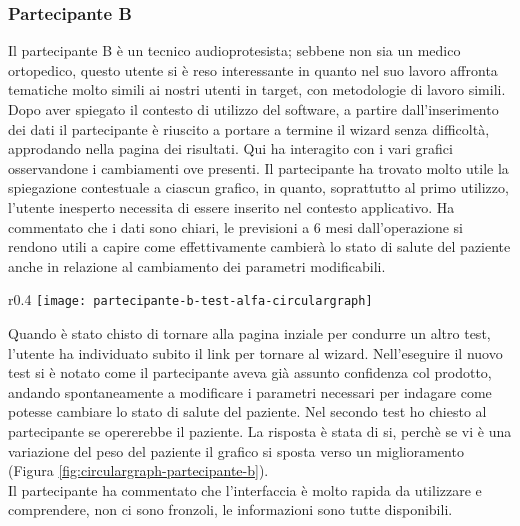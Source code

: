\subsubsection{Partecipante B}
Il partecipante B è un tecnico audioprotesista; sebbene non sia un medico ortopedico, questo utente si è reso interessante in quanto nel suo lavoro affronta tematiche molto simili ai nostri utenti in target, con metodologie di lavoro simili.\\
Dopo aver spiegato il contesto di utilizzo del software, a partire dall'inserimento dei dati il partecipante è riuscito a portare a termine il wizard senza difficoltà, approdando nella pagina dei risultati. Qui ha interagito con i vari grafici osservandone i cambiamenti ove presenti. Il partecipante ha trovato molto utile la spiegazione contestuale a ciascun grafico, in quanto, soprattutto al primo utilizzo, l'utente inesperto necessita di essere inserito nel contesto applicativo. Ha commentato che i dati sono chiari, le previsioni a 6 mesi dall'operazione si rendono utili a capire come effettivamente cambierà lo stato di salute del paziente anche in relazione al cambiamento dei parametri modificabili. \\

\begin{wrapfigure}{r}{0.4\textwidth}
    \centering
    \texttt{[image: partecipante-b-test-alfa-circulargraph]}
    \caption{Circulargraph del test Alfa condotto dal partecipante B}
    \caption*{In questo test si è indagato l'ambito dell'operazione all'anca}
    \label{fig:circulargraph-partecipante-b}
\end{wrapfigure}

Quando è stato chisto di tornare alla pagina inziale per condurre un altro test, l'utente ha individuato subito il link per tornare al wizard. Nell'eseguire il nuovo test si è notato come il partecipante aveva già assunto confidenza col prodotto, andando spontaneamente a modificare i parametri necessari per indagare come potesse cambiare lo stato di salute del paziente. Nel secondo test ho chiesto al partecipante se opererebbe il paziente. La risposta è stata di si, perchè se vi è una variazione del peso del paziente il grafico si sposta verso un miglioramento (Figura \ref{fig:circulargraph-partecipante-b}). \\
Il partecipante ha commentato che l'interfaccia è molto rapida da utilizzare e comprendere, non ci sono fronzoli, le informazioni sono tutte disponibili. \\

